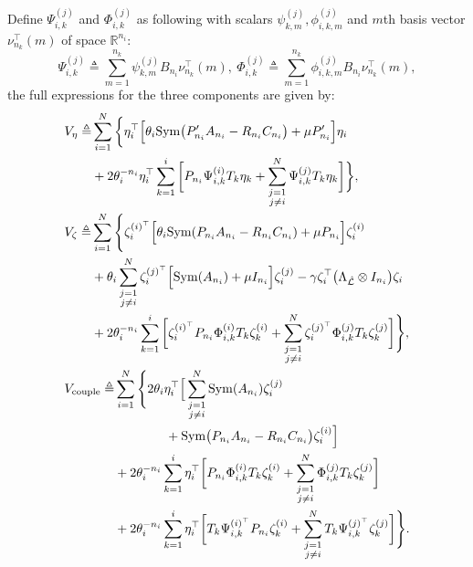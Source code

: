\documentclass{ifacconf}
\begin{document}
Define $\Psi_{i,k}^{(j)}$ and $\Phi^{(j)}_{i,k}$ as following with scalars $\psi^{(j)}_{k,m},\phi^{(j)}_{i,k,m}$ and $m$th basis vector $\nu_{n_k}^\top(m)$ of space $\mathbb{R}^{n_i}$:
\[\Psi_{i,k}^{(j)}\triangleq\sum^{n_k}_{m=1}\psi^{(j)}_{k,m}B_{n_i}\nu_{n_k}^\top(m),\ \Phi^{(j)}_{i,k}\triangleq\sum^{n_k}_{m=1}\phi^{(j)}_{i,k,m}B_{n_i}\nu_{n_k}^\top(m),\]
the full expressions for the three components are given by:
{\small
    \begin{align}
        &\begin{aligned}
             V_\eta\triangleq&\sum^{N}_{i=1}\bigg\{\eta_i^\top\Big[ \theta_i \mathrm{Sym}\big(P'_{n_i}A_{n_i}-R_{n_i}C_{n_i}\big)+\mu P'_{n_i}\Big]\eta_i\\
            &+2\theta_i^{-n_i}\eta_i^\top \sum^i_{k=1}\bigg[P_{n_i}\Psi_{i,k}^{(i)}T_k\eta_k+\sum^N_{\substack{j=1\\j\ne i}}\Psi_{i,k}^{(j)}T_k\eta_k\bigg]\bigg\},
        \end{aligned}\nonumber\\
        &\begin{aligned}
            V_\zeta\triangleq&\sum^N_{i=1}\Bigg\{\zeta^{(i)^\top}_i\Big[\theta_i\mathrm{Sym}(P_{n_i}A_{n_i}-R_{n_i}C_{n_i})+\mu P_{n_i}\Big]\zeta^{(i)}_i\\
            &+\theta_i\sum^N_{\substack{j=1\\j\ne i}}\zeta^{(j)^\top}_i\Big[\mathrm{Sym}(A_{n_i})+\mu I_{n_i}\Big]\zeta^{(j)}_i-\gamma\zeta_i^\top \big(\Lambda_{\hat{\mathcal{L}}}\otimes I_{n_i}\big)\zeta_i\\
            &+2\theta_i^{-n_i}\sum^i_{k=1}\bigg[\zeta_i^{(i)^\top}P_{n_i}\Phi^{(i)}_{i,k}T_k\zeta_k^{(i)}+\sum^N_{\substack{j=1\\j\ne i}}\zeta_i^{(j)^\top}\Phi^{(j)}_{i,k}T_k\zeta_k^{(j)}\bigg]\Bigg\},
        \end{aligned}\nonumber\\
        &\begin{aligned}
            V_{\rm couple} \triangleq&\sum^N_{i=1}\Bigg\{2\theta_i\eta_i^\top\Big[\sum^N_{\substack{j=1\\j\ne i}}\mathrm{Sym}(A_{n_i})\zeta^{(j)}_{i}\\
            &\qquad\qquad+\mathrm{Sym}\big(P_{n_i}A_{n_i}-R_{n_i}C_{n_i}\big)\zeta_i^{(i)}\Big]\\
                &+2\theta_i^{-n_i}\sum^i_{k=1}\eta^\top_i\bigg[P_{n_i}\Phi_{i,k}^{(i)}T_k\zeta_k^{(i)}+\sum^N_{\substack{j=1\\j\ne i}}\Phi^{(j)}_{i,k}T_k\zeta_k^{(j)}\bigg]\\
                &+2\theta_i^{-n_i}\sum^i_{k=1}\eta^\top_i\bigg[T_k\Psi_{i,k}^{(i)^\top}P_{n_i}\zeta_k^{(i)}+\sum^N_{\substack{j=1\\j\ne i}}T_k\Psi^{(j)^\top}_{i,k}\zeta_k^{(j)}\bigg]\Bigg\}.
        \end{aligned}\nonumber
    \end{align}
    }
\end{document}
